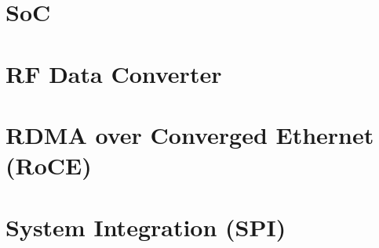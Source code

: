 \section{SoC}
\section{RF Data Converter}
\section{RDMA over Converged Ethernet (RoCE)}
\section{System Integration (SPI)}